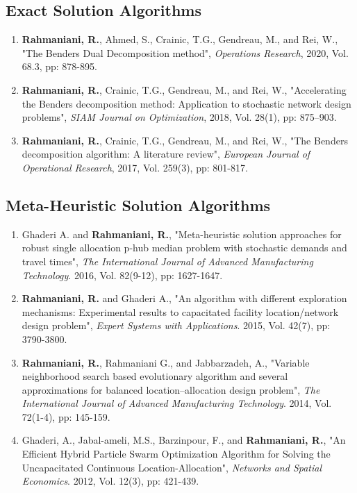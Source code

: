 \documentclass[10PT,letter]{article}
\newcommand{\subsectionstyle}[1]{\normalfont\selectfont\textcolor{titlecol}{\sffamily #1}}
\begin{document}
        \subsection*{\subsectionstyle{Exact  Solution Algorithms}}
	        \begin{enumerate}[itemsep=.5mm]
					\item 
								\textbf{Rahmaniani, R.}, Ahmed, S., Crainic, T.G., Gendreau, M., and Rei, W., "The Benders Dual Decomposition method", \textit{Operations Research}, 2020, Vol. 68.3, pp: 878-895.
					\item 
								\textbf{Rahmaniani, R.}, Crainic, T.G., Gendreau, M., and Rei, W., "Accelerating the Benders decomposition method: Application to stochastic network design problems", \textit{SIAM Journal on Optimization}, 2018, Vol. 28(1), pp: 875–903.
					\item
								 \textbf{Rahmaniani, R.}, Crainic, T.G., Gendreau, M., and Rei, W., "The Benders decomposition algorithm: A literature review", \textit{European Journal of Operational Research}, 2017, Vol. 259(3), pp: 801-817.
			\end{enumerate}
		\subsection*{\subsectionstyle{Meta-Heuristic  Solution Algorithms}}
			\begin{enumerate}[itemsep=.5mm]
				\item 
							Ghaderi A. and \textbf{Rahmaniani, R.}, "Meta-heuristic solution approaches for robust single allocation p-hub median problem with stochastic demands and travel times", \textit{The International Journal of Advanced Manufacturing Technology}. 2016, Vol. 82(9-12), pp: 1627-1647.
				\item 
							\textbf{Rahmaniani, R.} and Ghaderi A., "An algorithm with different exploration mechanisms: Experimental results to capacitated facility location/network design problem", \textit{Expert Systems with Applications}. 2015, Vol. 42(7), pp: 3790-3800.
				\item
							 \textbf{Rahmaniani, R.}, Rahmaniani G., and Jabbarzadeh, A., "Variable neighborhood search based evolutionary algorithm and several approximations for balanced location–allocation design problem", \textit{The International Journal of Advanced Manufacturing Technology}. 2014, Vol. 72(1-4), pp: 145-159.
				\item 
							Ghaderi, A., Jabal-ameli, M.S., Barzinpour, F., and \textbf{Rahmaniani, R.}, "An Efficient Hybrid Particle Swarm Optimization Algorithm for Solving the Uncapacitated Continuous Location-Allocation", \textit{Networks and Spatial Economics}. 2012, Vol. 12(3), pp: 421-439.
			\end{enumerate}
\end{document}
